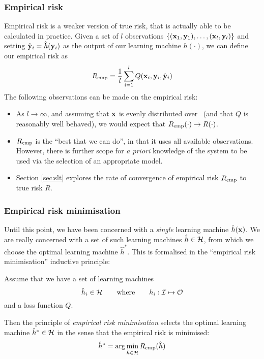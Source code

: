 \subsubsection{Empirical risk}
Empirical risk is a weaker version of true risk, that is actually able
to be calculated in practice.  Given a set of $l$ observations
$\{(\mathbf{x}_1, \mathbf{y}_1), \ldots, (\mathbf{x}_l, \mathbf{y}_l)\}$ and setting $\hat{\mathbf{y}}_i
= \hat{h}(\mathbf{y}_i)$ as the output of our learning machine $h(\cdot)$,
we can define our empirical risk as 
%
\begin{equation}
R_{\mathrm{emp}} = \frac{1}{l} \sum_{i=1}^{l} Q(\mathbf{x}_i, \mathbf{y}_i, \hat{\mathbf{y}}_i)
\end{equation}
%
The following observations can be made on the empirical risk:
%
\begin{itemize}
\item 	As $l \rightarrow \infty$, and assuming that $\mathbf{x}$ is evenly
	distributed over \calI\, (and that $Q$ is reasonably well
	behaved), we would expect that $R_{\mathrm{emp}}(\cdot) \rightarrow
	R(\cdot)$.

\item	$R_{\mathrm{emp}}$ is the ``best that we can do'', in that it uses all
	available observations.  However, there is further scope for
	\emph{a priori} knowledge of the system to be used via the
	selection of an appropriate model.

\item	Section \ref{sec:slt} explores the rate of convergence of
	empirical risk $R_{\mathrm{emp}}$ to true risk $R$.
\end{itemize}

\subsubsection{Empirical risk minimisation}

Until this point, we have been concerned with a \emph{single} learning
machine $\hat{h}(\mathbf{x})$.  We are really concerned with a set of such
learning machines $\hat{h} \in \mathcal{H}$, from which we choose the
optimal learning machine $\hat{h}^{\ast}$.  This is
formalised in the ``empirical risk minimisation'' inductive principle:

Assume that we have a set of learning machines
%
\begin{equation}
\hat{h}_i \in \mathcal{H} \qquad \mbox{where} \qquad h_i : \mathcal{I} \mapsto
\mathcal{O}
\end{equation}
%
and a loss function $Q$.

Then the principle of \emph{empirical risk minimisation} selects the
optimal learning machine $\hat{h}^{\ast} \in \mathcal{H}$ in the sense that
the empirical risk is minimised:
%
\begin{equation}
\hat{h}^{\ast} = \arg \min_{\hat{h} \in \mathcal{H}} R_{\mathrm{emp}}(\hat{h})
\label{eqn:erm}
\end{equation}

